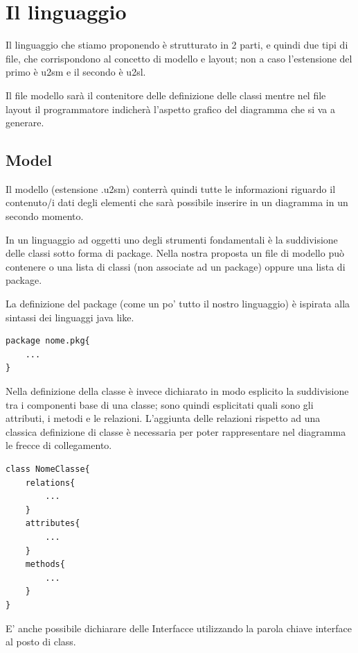 \chapter{Il linguaggio}

Il linguaggio che stiamo proponendo è strutturato in 2 parti, e quindi due tipi di
file, che corrispondono al concetto di modello e layout; non a caso l'estensione
del primo è u2sm e il secondo è u2sl.

Il file modello sarà il contenitore delle definizione delle classi mentre nel
file layout il programmatore indicherà l'aspetto grafico del diagramma che si va
a generare.


\section{Model}

Il modello (estensione .u2sm) conterrà quindi tutte le informazioni riguardo il
contenuto/i dati
degli elementi che sarà possibile inserire in un diagramma in un secondo
momento. 

In un linguaggio ad oggetti uno degli strumenti fondamentali è la suddivisione 
delle classi sotto forma di package. Nella nostra proposta un file di modello
può contenere o una lista di classi (non associate ad un package) oppure una
lista di package.

La definizione del package (come un po' tutto il nostro linguaggio) è 
ispirata alla sintassi dei linguaggi java like.

\begin{lstlisting}[caption={Dichiarazione di package}, style={model}]
package nome.pkg{
	...  	
}
\end{lstlisting}

Nella definizione della classe è invece dichiarato in modo esplicito la
suddivisione tra i componenti base di una classe; sono quindi esplicitati quali
sono gli attributi, i metodi e le relazioni. L'aggiunta delle relazioni rispetto
ad una classica definizione di classe è necessaria per poter rappresentare nel
diagramma le frecce di collegamento.


\begin{lstlisting}[caption={Dichiarazione di classe}, style={model}]
class NomeClasse{
	relations{
		...
	}
	attributes{
		...
	}
	methods{
		...
	}
}
\end{lstlisting}

E' anche possibile dichiarare delle Interfacce utilizzando la parola chiave
interface al posto di class. 


